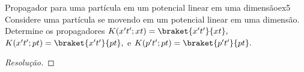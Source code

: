 \begin{exercício}{Propagador para uma partícula em um potencial linear em uma dimensão}{ex5}
   Considere uma partícula se movendo em um potencial linear em uma dimensão. Determine os propagadores \(K(x't'; xt) = \braket{x't'}{xt},\) \(K(x't'; pt) = \braket{x't'}{pt},\) e \(K(p't'; pt) = \braket{p't'}{pt}.\)
\end{exercício}
\begin{proof}[Resolução]
    
\end{proof}
